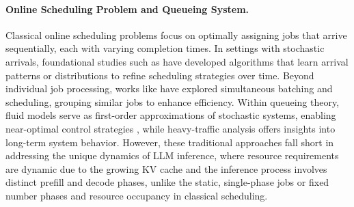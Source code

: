 \documentclass[10pt,letterpaper]{article}
\begin{document}
\paragraph*{Online Scheduling Problem and Queueing System.} 
Classical online scheduling problems focus on optimally assigning jobs that arrive sequentially, each with varying completion times. In settings with stochastic arrivals, foundational studies such as \cite{devanur2009adwords,vee2010optimal,cole2014sample,balkanski2016power,lattanzi2020online} have developed algorithms that learn arrival patterns or distributions to refine scheduling strategies over time. Beyond individual job processing, works like \cite{im2013online,lucier2013efficient,liu2015online,li2020online} have explored simultaneous batching and scheduling, grouping similar jobs to enhance efficiency. Within queueing theory, fluid models serve as first-order approximations of stochastic systems, enabling near-optimal control strategies \cite{mandelbaum1998strong,maglaras2000discrete,bauerle2002optimal,liu2011network}, while heavy-traffic analysis offers insights into long-term system behavior. However, these traditional approaches fall short in addressing the unique dynamics of LLM inference, where resource requirements are dynamic due to the growing KV cache and the inference process involves distinct prefill and decode phases, unlike the static, single-phase jobs or fixed number phases and resource occupancy in classical scheduling.
\end{document}
